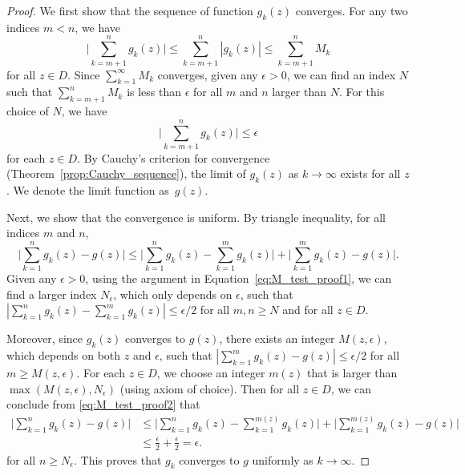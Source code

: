 \begin{proof}
	We first show that the sequence of function $g_k(z)$ converges. For any two indices $m<n$, we have
	\begin{equation}
		\big| \sum_{k=m+1}^n g_k(z) \big| \leq 
		\sum_{k=m+1}^n  |g_k(z)| \leq \sum_{k=m+1}^n M_k
		\label{eq:M_test_proof1}
	\end{equation}
	for all $z\in D$. Since $\sum_{k=1}^\infty M_k$ converges, given any $\epsilon >0$, we can find an index $N$ such that $\displaystyle \sum_{k=m+1}^n M_k$ is less than $\epsilon$  for all $m$ and $n$ larger than $N$. For this choice of $N$, we have 
	$$
	\Big| \sum_{k=m+1}^n g_k(z) \Big| \leq \epsilon
	$$
	for each $z\in D$. By Cauchy's criterion for convergence (Theorem~\ref{prop:Cauchy_sequence}), the limit of $g_k(z)$ as $k\rightarrow \infty$ exists for all $z$. We denote the limit function as~$g(z)$.
	
	Next, we show that the convergence is uniform. By triangle inequality, for all indices $m$ and $n$, 
	\begin{equation} \big|\sum_{k=1}^n g_k(z) - g(z)\big| \leq 
		\big|\sum_{k=1}^n g_k(z) - \sum_{k=1}^m g_k(z)\big| + \big|\sum_{k=1}^m g_k(z) - g(z)\big|.
		\label{eq:M_test_proof2}
	\end{equation}
	Given any $\epsilon>0$, using the argument in Equation~\eqref{eq:M_test_proof1}, we can find a larger index $N_\epsilon$, which only depends on $\epsilon$, such that $|\sum_{k=1}^n g_k(z) - \sum_{k=1}^m g_k(z)|\leq \epsilon/2$ for all $m,n\geq N$ and for all $z\in D$. 
	
	Moreover, since $g_k(z)$ converges to $g(z)$, there exists an integer $M(z,\epsilon)$, which depends on both $z$ and $\epsilon$, such that $|\sum_{k=1}^m g_k(z) - g(z)| \leq \epsilon/2$ for all $m\geq M(z,\epsilon)$. For each $z \in D$, we choose an integer $m(z)$ that is larger than $\max(M(z,\epsilon), N_\epsilon)$ (using axiom of choice). Then for all $z\in D$, we can conclude from \eqref{eq:M_test_proof2} that
	\begin{align*}
		\big|\sum_{k=1}^n g_k(z) - g(z)\big| 
		& \leq  \big|\sum_{k=1}^n g_k(z) - \sum_{k=1}^{m(z)} g_k(z)\big| + \big|\sum_{k=1}^{m(z)} g_k(z) - g(z)\big| \\
		& \leq \frac{\epsilon}{2} + \frac{\epsilon}{2} = \epsilon.
	\end{align*}
	for all $n\geq N_\epsilon$. This proves that $g_k$ converges to $g$ uniformly as $k\rightarrow\infty$.
\end{proof}





